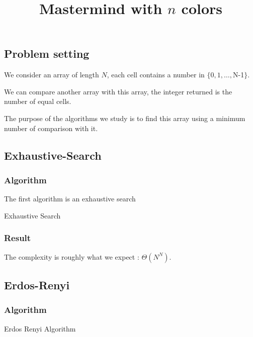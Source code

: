 \documentclass[12pt]{article}
\title{Mastermind with $n$ colors}
\author{}
\date{}
\theoremstyle{definition}
\theoremstyle{plain}
\theoremstyle{remark}
\begin{document}
\maketitle

\subsection{Problem setting}

We consider an array of length $N$, each cell contains a number in $\{0, 1, \ldots, $N-1$ \}$.

We can compare another array with this array, the integer returned is the number of equal cells.

The purpose of the algorithms we study is to find this array using a minimum number of comparison with it.

\subsection{Exhaustive-Search}
\subsubsection{Algorithm}

The first algorithm is an exhaustive search

\begin{algorithm}[H]
	\caption{Exhaustive Search}
\end{algorithm}

\subsubsection{Result}


The complexity is roughly what we expect : $\Theta(N^N)$.

\subsection{Erdos-Renyi}

\subsubsection{Algorithm}
\begin{algorithm}[H]
	\caption{Erdos Renyi Algorithm}
\end{algorithm}
\end{document}
